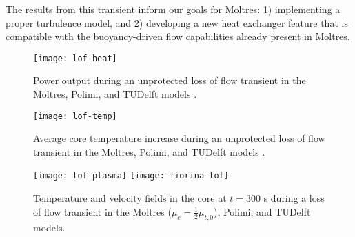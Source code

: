 The results from this transient inform our goals for Moltres: 1)
implementing a proper turbulence model, and
2) developing a new heat exchanger feature that is compatible with the
buoyancy-driven flow capabilities already present in Moltres.

\begin{figure}[htbp!]
    \centering
    \texttt{[image: lof-heat]}
    \caption{Power output during
    an unprotected loss of flow transient in the Moltres, Polimi, and
    TUDelft models \cite{fiorina_modelling_2014}.}
    \label{fig:lofheat}
    \texttt{[image: lof-temp]}
    \caption{Average core temperature increase during
    an unprotected loss of flow transient in the Moltres, Polimi, and
    TUDelft models \cite{fiorina_modelling_2014}.}
    \label{fig:loftemp}
\end{figure}

\clearpage

\begin{figure}[htbp!]
    \centering
    \texttt{[image: lof-plasma]}
    \texttt{[image: fiorina-lof]}
    \caption{Temperature and velocity fields in the core at $t=300$ s during
    a loss of flow transient in the Moltres ($\mu_c = \frac{1}{2} \mu_{t,0}$),
    Polimi, and TUDelft models.}
    \label{fig:lofflowtemp}
\end{figure}
